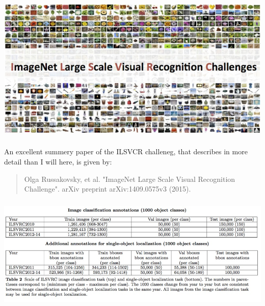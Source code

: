\documentclass[xetex,mathserif,serif,aspectratio=169]{beamer}
\begin{document}
\begin{frame}[fragile] \frametitle{} \oldB \small

\begin{center}
\includegraphics[width=\textwidth]{img/ilsvrc.jpg}
\end{center}

\end{frame}

\begin{frame}[fragile] \frametitle{} \oldB \small


An excellent summery paper of the ILSVCR challeneg, that
describes in more detail than I will here, is given by:
\begin{quote}
Olga Russakovsky, et al. "ImageNet Large Scale Visual Recognition Challenge".
arXiv preprint arXiv:1409.0575v3 (2015).
\end{quote}

\end{frame}

\begin{frame}[fragile] \frametitle{} \oldB \small

\begin{center}
\includegraphics[width=\textwidth]{img/ilsvrcSize.jpg}
\end{center}

\end{frame}
\end{document}
